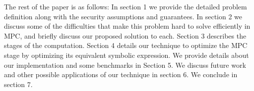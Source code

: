 The rest of the paper is as follows: In section 1 we provide the detailed problem definition along with the security assumptions and guarantees. In section 2 we discuss some of the difficulties that make this problem hard to solve efficiently in MPC, and briefly discuss our proposed solution to each. Section 3 describes the stages of the computation. Section 4 details our technique to optimize the MPC stage by optimizing its equivalent symbolic expression. We provide details about our implementation and some benchmarks in Section 5. We discuss future work and other possible applications of our technique in section 6. We conclude in section 7.